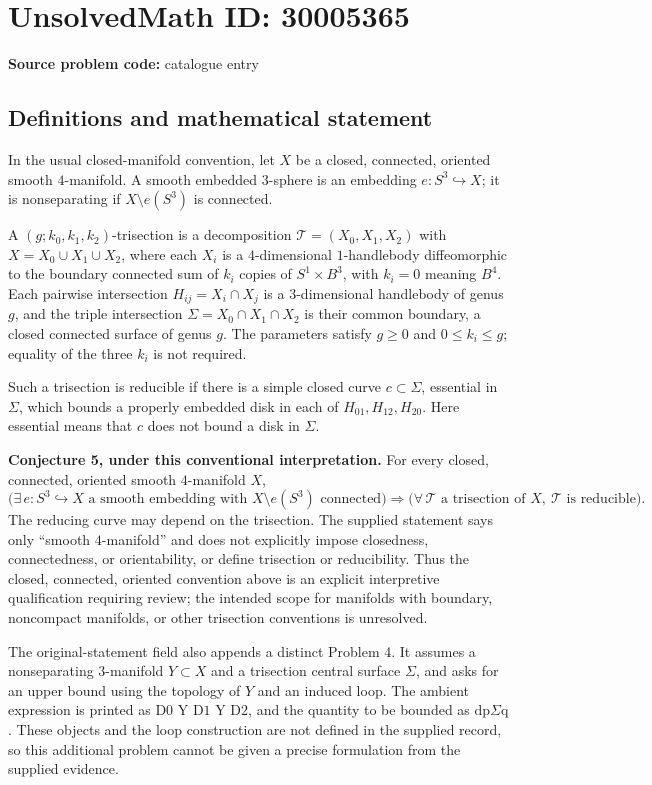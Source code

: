 \documentclass[11pt]{article}
\begin{document}
\section*{UnsolvedMath ID: 30005365}
\textbf{Source problem code:} catalogue entry
\subsection{Definitions and mathematical statement}
In the usual closed-manifold convention, let \(X\) be a closed, connected, oriented smooth \(4\)-manifold. A smooth embedded \(3\)-sphere is an embedding \(e:S^3\hookrightarrow X\); it is nonseparating if \(X\setminus e(S^3)\) is connected.

A \((g;k_0,k_1,k_2)\)-trisection is a decomposition \(\mathcal T=(X_0,X_1,X_2)\) with \(X=X_0\cup X_1\cup X_2\), where each \(X_i\) is a \(4\)-dimensional \(1\)-handlebody diffeomorphic to the boundary connected sum of \(k_i\) copies of \(S^1\times B^3\), with \(k_i=0\) meaning \(B^4\). Each pairwise intersection \(H_{ij}=X_i\cap X_j\) is a \(3\)-dimensional handlebody of genus \(g\), and the triple intersection \(\Sigma=X_0\cap X_1\cap X_2\) is their common boundary, a closed connected surface of genus \(g\). The parameters satisfy \(g\geq 0\) and \(0\leq k_i\leq g\); equality of the three \(k_i\) is not required.

Such a trisection is reducible if there is a simple closed curve \(c\subset\Sigma\), essential in \(\Sigma\), which bounds a properly embedded disk in each of \(H_{01},H_{12},H_{20}\). Here essential means that \(c\) does not bound a disk in \(\Sigma\).

\textbf{Conjecture 5, under this conventional interpretation.} For every closed, connected, oriented smooth \(4\)-manifold \(X\),
\[
\bigl(\exists\, e:S^3\hookrightarrow X\text{ a smooth embedding with }X\setminus e(S^3)\text{ connected}\bigr)
\Longrightarrow
\bigl(\forall\,\mathcal T\text{ a trisection of }X,\ \mathcal T\text{ is reducible}\bigr).
\]
The reducing curve may depend on the trisection. The supplied statement says only ``smooth \(4\)-manifold'' and does not explicitly impose closedness, connectedness, or orientability, or define trisection or reducibility. Thus the closed, connected, oriented convention above is an explicit interpretive qualification requiring review; the intended scope for manifolds with boundary, noncompact manifolds, or other trisection conventions is unresolved.

The original-statement field also appends a distinct Problem 4. It assumes a nonseparating \(3\)-manifold \(Y\subset X\) and a trisection central surface \(\Sigma\), and asks for an upper bound using the topology of \(Y\) and an induced loop. The ambient expression is printed as \(\text{D0 Y D1 Y D2}\), and the quantity to be bounded as \(\mathrm{dp}\Sigma\mathrm{q}\). These objects and the loop construction are not defined in the supplied record, so this additional problem cannot be given a precise formulation from the supplied evidence.
\end{document}
